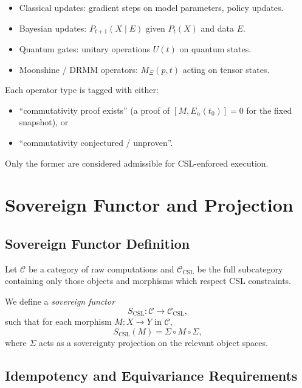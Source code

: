 \documentclass[11pt]{article}
\begin{document}
\begin{itemize}[leftmargin=*]
  \item Classical updates: gradient steps on model parameters, policy updates.
  \item Bayesian updates: $P_{t+1}(X\mid E)$ given $P_t(X)$ and data $E$.
  \item Quantum gates: unitary operations $U(t)$ on quantum states.
  \item Moonshine / DRMM operators: $M_\Xi(p,t)$ acting on tensor states.
\end{itemize}

Each operator type is tagged with either:
\begin{itemize}[leftmargin=*]
  \item ``commutativity proof exists'' (a proof of $[M, E_\alpha(t_0)] = 0$ for the fixed snapshot), or
  \item ``commutativity conjectured / unproven''.
\end{itemize}

Only the former are considered admissible for CSL-enforced execution.

\section{Sovereign Functor and Projection}

\subsection{Sovereign Functor Definition}

Let $\mathcal{C}$ be a category of raw computations and $\mathcal{C}_{\mathrm{CSL}}$ be the full subcategory containing only those objects and morphisms which respect CSL constraints.

We define a \emph{sovereign functor}
\[
  S_{\mathrm{CSL}} : \mathcal{C} \to \mathcal{C}_{\mathrm{CSL}},
\]
such that for each morphism $M: X \to Y$ in $\mathcal{C}$,
\begin{equation}
  S_{\mathrm{CSL}}(M) = \Sigma \circ M \circ \Sigma,
  \label{eq:scsl-def}
\end{equation}
where $\Sigma$ acts as a sovereignty projection on the relevant object spaces.

\subsection{Idempotency and Equivariance Requirements}
\end{document}
